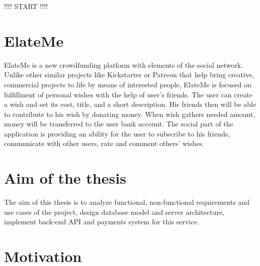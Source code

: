 !!!! START !!!!


\section{ElateMe}
ElateMe is a new crowdfunding platform with elements of the social network. Unlike other similar projects like
Kickstarter or Patreon that help bring creative, commercial projects to life by means of interested people, ElateMe
is focused on fulfillment of personal wishes with the help of user’s friends. The user can create a wish and set
its cost, title, and a short description. His friends then will be able to contribute to his wish by donating money.
When wish gathers needed amount, money will be transferred to the user bank account. The social part of the
application is providing an ability for the user to subscribe to his friends, communicate with other users,
rate and comment others’ wishes.\par

\section{Aim of the thesis}
The aim of this thesis is to analyze functional, non-functional requirements and use cases of the project, design
database model and server architecture, implement back-end \ac{API} and payments system for this service.

\section{Motivation}
